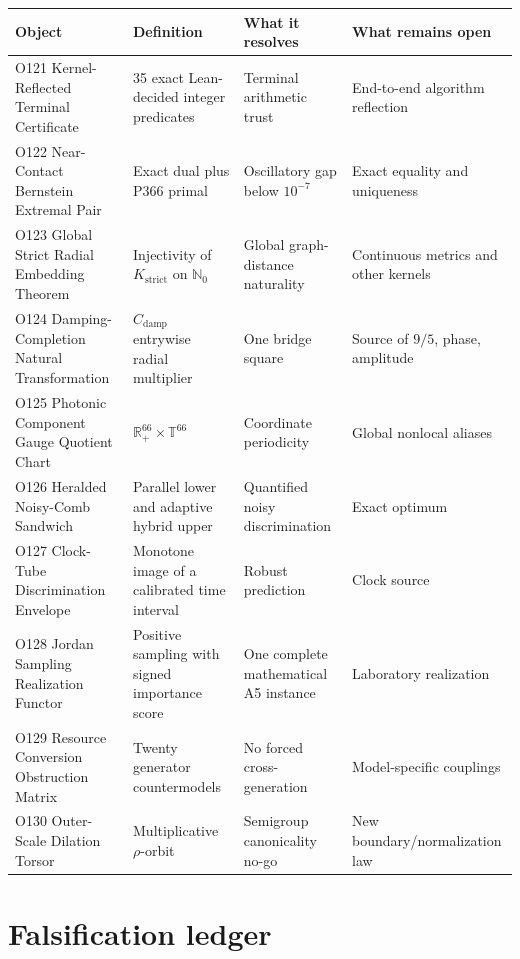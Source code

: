 \documentclass[11pt,a4paper,openany]{report}
\begin{document}
\begin{center}
\begingroup\small
\setlength{\tabcolsep}{2.5pt}
\renewcommand{\arraystretch}{1.16}
\begin{longtable}{@{}p{}p{}p{}p{}@{}}
\toprule
\textbf{Object} & \textbf{Definition} & \textbf{What it resolves} & \textbf{What remains open} \\
\midrule
\endhead
O121 Kernel-Reflected Terminal Certificate & 35 exact Lean-decided integer predicates & Terminal arithmetic trust & End-to-end algorithm reflection \\
O122 Near-Contact Bernstein Extremal Pair & Exact dual plus P366 primal & Oscillatory gap below \(10^{-7}\) & Exact equality and uniqueness \\
O123 Global Strict Radial Embedding Theorem & Injectivity of \(K_{\mathrm{strict}}\) on \(\mathbb N_0\) & Global graph-distance naturality & Continuous metrics and other kernels \\
O124 Damping-Completion Natural Transformation & \(C_{\mathrm{damp}}\) entrywise radial multiplier & One bridge square & Source of \(9/5\), phase, amplitude \\
O125 Photonic Component Gauge Quotient Chart & \(\mathbb R_+^{66}\times\mathbb T^{66}\) & Coordinate periodicity & Global nonlocal aliases \\
O126 Heralded Noisy-Comb Sandwich & Parallel lower and adaptive hybrid upper & Quantified noisy discrimination & Exact optimum \\
O127 Clock-Tube Discrimination Envelope & Monotone image of a calibrated time interval & Robust prediction & Clock source \\
O128 Jordan Sampling Realization Functor & Positive sampling with signed importance score & One complete mathematical A5 instance & Laboratory realization \\
O129 Resource Conversion Obstruction Matrix & Twenty generator countermodels & No forced cross-generation & Model-specific couplings \\
O130 Outer-Scale Dilation Torsor & Multiplicative \(\rho\)-orbit & Semigroup canonicality no-go & New boundary/\allowbreak{}normalization law \\
\bottomrule
\end{longtable}
\endgroup
\end{center}

\chapter{Falsification ledger}
\end{document}
